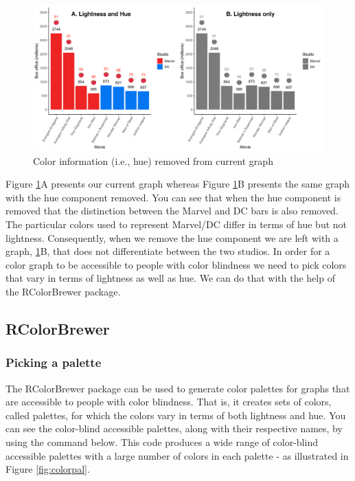 \documentclass[
]{krantz}
\begin{document}
\begin{figure}
\includegraphics[width=0.85\linewidth]{ch_graphing/images/nocolorcomparison} \caption{Color information (i.e., hue) removed from current graph}\label{fig:colorcomparison}
\end{figure}

Figure \ref{fig:colorcomparison}A presents our current graph whereas Figure \ref{fig:colorcomparison}B presents the same graph with the hue component removed. You can see that when the hue component is removed that the distinction between the Marvel and DC bars is also removed. The particular colors used to represent Marvel/DC differ in terms of hue but not lightness. Consequently, when we remove the hue component we are left with a graph, \ref{fig:colorcomparison}B, that does not differentiate between the two studios. In order for a color graph to be accessible to people with color blindness we need to pick colors that vary in terms of lightness as well as hue. We can do that with the help of the RColorBrewer package.

\hypertarget{rcolorbrewer}{%
\subsection{RColorBrewer}\label{rcolorbrewer}}

\hypertarget{picking-a-palette}{%
\subsubsection{Picking a palette}\label{picking-a-palette}}

The RColorBrewer package can be used to generate color palettes for graphs that are accessible to people with color blindness. That is, it creates sets of colors, called palettes, for which the colors vary in terms of both lightness and hue. You can see the color-blind accessible palettes, along with their respective names, by using the command below. This code produces a wide range of color-blind accessible palettes with a large number of colors in each palette - as illustrated in Figure \ref{fig:colorpal}.
\end{document}
